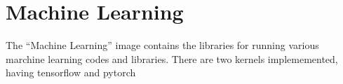 \section{Machine Learning}

The ``Machine Learning'' image contains the libraries for running various marchine learning codes and libraries.  There are two kernels implememented, having tensorflow and pytorch